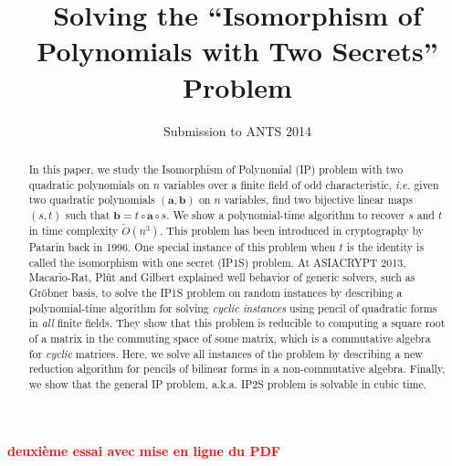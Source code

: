 \documentclass{lms}%
\def\commentaire#1{{\bfseries\textcolor{red}{#1}}}
\begin{document}
\title[Solving ``Isomorphism of Polynomials with Two Secrets'']%
{Solving the ``Isomorphism of Polynomials with Two Secrets'' Problem}%
\author{Submission to ANTS 2014}
\maketitle

\commentaire{deuxième essai avec mise en ligne du PDF}
\begin{abstract}
In this paper, we study the Isomorphism of Polynomial (IP) problem with two
quadratic polynomials on $n$ variables over a finite field of odd
characteristic, \textit{i.e.} given two quadratic polynomials $(\bm{a},\bm{b})$ 
on $n$ variables, find two bijective linear maps $(s,t)$ such that 
$\bm{b}=t\circ \bm{a}\circ s$. We show a
polynomial-time algorithm to recover $s$ and $t$ in time complexity $\widetilde{O}(n^3)$.
This problem has been introduced in cryptography by Patarin back in 1996.
One special instance of this problem when $t$ is the identity is called
the isomorphism with one secret (IP1S) problem. At ASIACRYPT 2013, Macario-Rat, Pl\^ut and Gilbert
explained well behavior of generic solvers, such as Gr\"obner basis, to
solve the IP1S problem on random instances by describing a polynomial-time
algorithm for solving \textit{cyclic instances} using pencil of quadratic forms 
in \textit{all} finite fields. They show that this problem is
reducible to computing a square root of a matrix in the commuting space of 
some matrix, which is a commutative algebra for \textit{cyclic} matrices. Here, we solve all
instances of the problem by describing a new reduction algorithm for
pencils of bilinear forms in a non-commutative algebra. Finally, we show
that the general IP problem, a.k.a. IP2S problem is solvable in cubic
time.
\end{abstract}
\end{document}
